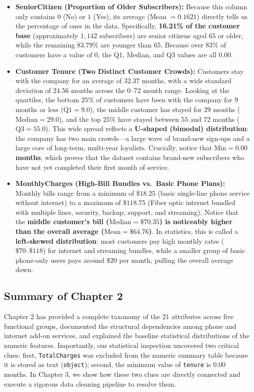 \begin{itemize}
    \item \textbf{SeniorCitizen (Proportion of Older Subscribers):} Because this column only contains $0$ (No) or $1$ (Yes), its average (Mean $= 0.1621$) directly tells us the percentage of ones in the data. Specifically, \textbf{16.21\% of the customer base} (approximately $1,142$ subscribers) are senior citizens aged $65$ or older, while the remaining $83.79\%$ are younger than $65$. Because over $83\%$ of customers have a value of $0$, the Q1, Median, and Q3 values are all $0.00$.
    \item \textbf{Customer Tenure (Two Distinct Customer Crowds):} Customers stay with the company for an average of $32.37$ months, with a wide standard deviation of $24.56$ months across the $0\text{--}72$ month range. Looking at the quartiles, the bottom $25\%$ of customers have been with the company for $9$ months or less ($\text{Q1} = 9.0$), the middle customer has stayed for $29$ months ($\text{Median} = 29.0$), and the top $25\%$ have stayed between $55$ and $72$ months ($\text{Q3} = 55.0$). This wide spread reflects a \textbf{U-shaped (bimodal) distribution}: the company has two main crowds---a large wave of brand-new sign-ups and a large core of long-term, multi-year loyalists. Crucially, notice that \textbf{$\text{Min} = 0.00$ months}, which proves that the dataset contains brand-new subscribers who have not yet completed their first month of service.
    \item \textbf{MonthlyCharges (High-Bill Bundles vs.\ Basic Phone Plans):} Monthly bills range from a minimum of $\$18.25$ (basic single-line phone service without internet) to a maximum of $\$118.75$ (Fiber optic internet bundled with multiple lines, security, backup, support, and streaming). Notice that the \textbf{middle customer's bill ($\text{Median} = \$70.35$) is noticeably higher than the overall average ($\text{Mean} = \$64.76$)}. In statistics, this is called a \textbf{left-skewed distribution}: most customers pay high monthly rates ($\$70\text{--}\$118$) for internet and streaming bundles, while a smaller group of basic phone-only users pays around $\$20$ per month, pulling the overall average down.
\end{itemize}

\subsection{Summary of Chapter 2}
Chapter 2 has provided a complete taxonomy of the $21$ attributes across five functional groups, documented the structural dependencies among phone and internet add-on services, and explained the baseline statistical distributions of the numeric features. Importantly, our statistical inspection uncovered two critical clues: first, \texttt{TotalCharges} was excluded from the numeric summary table because it is stored as text (\texttt{object}); second, the minimum value of \texttt{tenure} is $0.00$ months. In Chapter 3, we show how these two clues are directly connected and execute a rigorous data cleaning pipeline to resolve them.